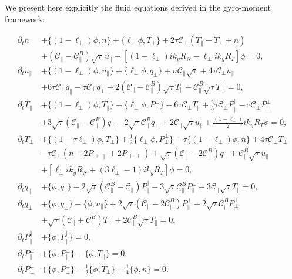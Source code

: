 \documentclass{article}
\begin{document}
We present here explicitly the fluid equations derived in the gyro-moment framework:

\begin{align}
\partial_t n &+ \{(1 - \ell_\perp)\phi, n\} + \{\ell_\perp \phi, T_\perp\} + 2\tau \mathcal{C}_\perp(T_\parallel - T_\perp + n) \nonumber\\
&+ (\mathcal{C}_\parallel - \mathcal{C}_\parallel^B)\sqrt{\tau}\, u_\parallel + \left[(1 - \ell_\perp)i k_y R_N - \ell_\perp i k_y R_T\right]\phi = 0,\\
\partial_t u_\parallel &+ \{(1 - \ell_\perp)\phi, u_\parallel\} + \{\ell_\perp \phi, q_\perp\} + n \mathcal{C}_\parallel\sqrt{\tau} + 4 \tau \mathcal{C}_\perp u_\parallel \nonumber\\
&+ 6\tau \mathcal{C}_\perp q_\parallel - \tau \mathcal{C}_\perp q_\perp + 2(\mathcal{C}_\parallel - \mathcal{C}_\parallel^B)\sqrt{\tau} T_\parallel - \mathcal{C}_\parallel^B\sqrt{\tau} T_\perp = 0,\\
\partial_t T_\parallel &+ \{(1 - \ell_\perp)\phi, T_\parallel\} + \{\ell_\perp \phi, P_\parallel^\perp\} + 6\tau \mathcal{C}_\perp T_\parallel + \frac{2}{3}\tau \mathcal{C}_\perp P_\parallel^\parallel - \tau \mathcal{C}_\perp P_\parallel^\perp \nonumber\\
&+ 3\sqrt{\tau}(\mathcal{C}_\parallel - \mathcal{C}_\parallel^B) q_\parallel - 2\sqrt{\tau} \mathcal{C}_\parallel^B q_\perp + 2 \mathcal{C}_\parallel\sqrt{\tau} u_\parallel + \frac{(1 - \ell_\perp)}{2}i k_y R_T \phi = 0,\\
\partial_t T_\perp &+ \{(1 - \tau \ell_\perp)\phi, T_\perp\} + \frac{1}{2}\{\ell_\perp \phi, P_\perp^\perp\} - \tau\{(1 - \ell_\perp)\phi, n\} + 4\tau \mathcal{C}_\perp T_\perp \nonumber\\
&- \tau \mathcal{C}_\perp(n - 2P_{\perp\parallel} + 2P_{\perp\perp}) + \sqrt{\tau}(\mathcal{C}_\parallel - 2\mathcal{C}_\parallel^B) q_\perp + \mathcal{C}_\parallel^B\sqrt{\tau} u_\parallel \nonumber\\
&+ \left[\ell_\perp i k_y R_N + (3\ell_\perp - 1) i k_y R_T\right]\phi = 0,\\
\partial_t q_\parallel &+ \{\phi, q_\parallel\} - 2\sqrt{\tau}(\mathcal{C}_\parallel^B - \mathcal{C}_\parallel)P_\parallel^\parallel - 3\sqrt{\tau} \mathcal{C}_\parallel^B P_\parallel^\perp + 3 \mathcal{C}_\parallel\sqrt{\tau} T_\parallel = 0,\\
\partial_t q_\perp &+ \{\phi, q_\perp\} - \{\phi, u_\parallel\} + 2\sqrt{\tau}(\mathcal{C}_\parallel - 2\mathcal{C}_\parallel^B)P_\parallel^\perp - 2\sqrt{\tau} \mathcal{C}_\parallel^B P_\perp^\perp \nonumber\\
&+ \sqrt{\tau}(\mathcal{C}_\parallel + \mathcal{C}_\parallel^B)T_\perp + 2 \mathcal{C}_\parallel^B\sqrt{\tau} T_\parallel = 0,\\
\partial_t P_\parallel^\parallel &+ \{\phi, P_\parallel^\parallel\} = 0, \\
\partial_t P_\parallel^\perp &+ \{\phi, P_\parallel^\perp\} - \{\phi, T_\parallel\} = 0, \\
\partial_t P_\perp^\perp &+ \{\phi, P_\perp^\perp\} - \frac{1}{2}\{\phi, T_\perp\} + \frac{1}{4}\{\phi, n\} = 0.
\end{align}
\end{document}
